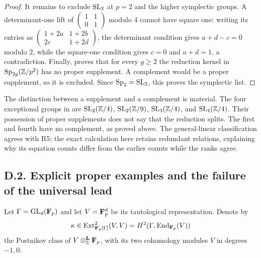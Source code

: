 \begin{proof}
It remains to exclude $\operatorname{SL}_2$ at $p=2$ and the higher symplectic groups.  A determinant-one lift of $\left(\begin{smallmatrix}1&1\\0&1\end{smallmatrix}\right)$ modulo $4$ cannot have square one: writing its entries as $\left(\begin{smallmatrix}1+2a&1+2b\\2c&1+2d\end{smallmatrix}\right)$, the determinant condition gives $a+d-c=0$ modulo $2$, while the square-one condition gives $c=0$ and $a+d=1$, a contradiction.  Finally, \cite[Theorem~2.5]{DetinkoFlanneryHulpke2018} proves that for every $g\geq2$ the reduction kernel in $\operatorname{Sp}_{2g}(\mathbb Z/p^2)$ has no proper supplement.  A complement would be a proper supplement, so it is excluded.  Since $\operatorname{Sp}_2=\operatorname{SL}_2$, this proves the symplectic list.
\end{proof}

\begin{remark}\label{auto:D:fa384818cda6}

The distinction between a supplement and a complement is material.  The four exceptional groups in \cite[Theorem~2.5]{DetinkoFlanneryHulpke2018} are $\operatorname{SL}_2(\mathbb Z/4)$, $\operatorname{SL}_2(\mathbb Z/9)$, $\operatorname{SL}_3(\mathbb Z/4)$, and $\operatorname{SL}_4(\mathbb Z/4)$.  Their possession of proper supplements does not say that the reduction splits.  The first and fourth have no complement, as proved above.  The general-linear classification agrees with R5; the exact calculation here retains redundant relations, explaining why its equation counts differ from the earlier counts while the ranks agree.
\end{remark}

\subsection{D.2. Explicit proper examples and the failure of the universal lead}

Let $\Gamma=\operatorname{GL}_d(\mathbf F_p)$ and let $V=\mathbf F_p^d$ be its tautological representation.  Denote by
\[
 \kappa\in\operatorname{Ext}^2_{\mathbf F_p[\Gamma]}(V,V)
       =H^2(\Gamma,\operatorname{End}_{\mathbf F_p}(V))
\]
the Postnikov class of $V\otimes^{\mathbf L}_{\mathbb Z}\mathbf F_p$, with its two cohomology modules $V$ in degrees $-1,0$.

